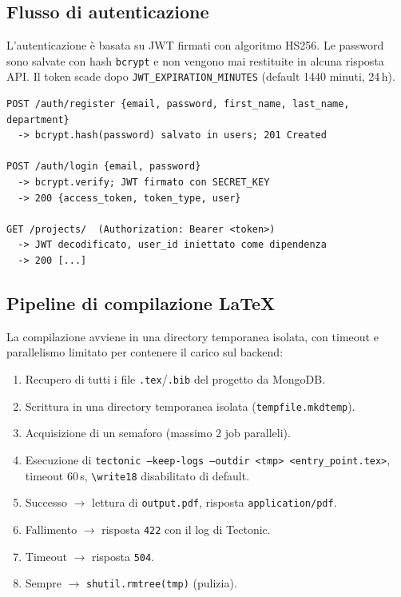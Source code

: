 \documentclass[11pt,a4paper]{article}
\begin{document}
\pagebreak

\subsection{Flusso di autenticazione}

L'autenticazione è basata su JWT firmati con algoritmo HS256. Le password sono salvate con hash \texttt{bcrypt} e non vengono mai restituite in alcuna risposta API. Il token scade dopo \texttt{JWT\_EXPIRATION\_MINUTES} (default 1440 minuti, 24\,h).

\begin{lstlisting}
POST /auth/register {email, password, first_name, last_name, department}
  -> bcrypt.hash(password) salvato in users; 201 Created

POST /auth/login {email, password}
  -> bcrypt.verify; JWT firmato con SECRET_KEY
  -> 200 {access_token, token_type, user}

GET /projects/  (Authorization: Bearer <token>)
  -> JWT decodificato, user_id iniettato come dipendenza
  -> 200 [...]
\end{lstlisting}

\subsection{Pipeline di compilazione LaTeX}

La compilazione avviene in una directory temporanea isolata, con timeout e parallelismo limitato per contenere il carico sul backend:

\begin{enumerate}[leftmargin=2.2em]
  \item Recupero di tutti i file \texttt{.tex}/\texttt{.bib} del progetto da MongoDB.
  \item Scrittura in una directory temporanea isolata (\texttt{tempfile.mkdtemp}).
  \item Acquisizione di un semaforo (massimo 2 job paralleli).
  \item Esecuzione di \texttt{tectonic --keep-logs --outdir <tmp> <entry\_point.tex>}, timeout 60\,s, \texttt{\textbackslash write18} disabilitato di default.
  \item Successo $\to$ lettura di \texttt{output.pdf}, risposta \texttt{application/pdf}.
  \item Fallimento $\to$ risposta \texttt{422} con il log di Tectonic.
  \item Timeout $\to$ risposta \texttt{504}.
  \item Sempre $\to$ \texttt{shutil.rmtree(tmp)} (pulizia).
\end{enumerate}
\end{document}
